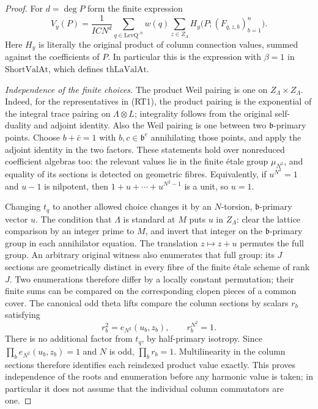 \begin{proof}
For $d=\deg P$ form the finite expression
\begin{equation}\label{eq:actual-raw-theta-sum}
 V_y(P)=\frac{1}{ICN^d}
       \sum_{q\in\mathrm{LevQ}^{,n}}w(q)
       \sum_{z\in Z_\Lambda}
          H_y\bigl(P;(F_{q,z,b})_{b=1}^n\bigr).
\end{equation}
Here $H_y$ is literally the original product of column connection
values, summed against the coefficients of $P$.  In particular
this is the expression with $\beta=1$ in
$\mathrm{ShortValAt}$, which defines $\mathrm{thLaValAt}$.

\emph{Independence of the finite choices.}
The product Weil pairing is one on
$Z_\Lambda\times Z_\Lambda$.  Indeed, for the representatives
in \textup{(RT1)}, the product pairing is the exponential of the
integral trace pairing on $\Lambda\otimes L$; integrality follows
from the original self-duality and adjoint identity.
Also the Weil pairing is one between two
$\mathfrak b$-primary points.  Choose
$b+\bar c=1$ with $b,c\in\mathfrak b^e$ annihilating those
points, and apply the adjoint identity in the two factors.
These statements hold over nonreduced coefficient algebras too:
the relevant values lie in the finite \'etale group
$\mu_{N^2}$, and equality of its sections is detected on
geometric fibres.  Equivalently, if $u^{N^2}=1$ and $u-1$ is
nilpotent, then
$1+u+\cdots+u^{N^2-1}$ is a unit, so $u=1$.

Changing $t_q$ to another allowed choice changes it by an
$N$-torsion, $\mathfrak b$-primary vector $u$.
The condition that $\Lambda$ is standard at $M$ puts $u$ in
$Z_\Lambda$: clear the lattice comparison by an integer prime
to $M$, and invert that integer on the $\mathfrak b$-primary
group in each annihilator equation.
The translation $z\mapsto z+u$ permutes the full group.
An arbitrary original witness also enumerates that full group:
its $J$ sections are geometrically distinct in every fibre of
the finite \'etale scheme of rank $J$.  Two enumerations
therefore differ by a locally constant permutation; their
finite sums can be compared on the corresponding clopen
pieces of a common cover.
The canonical odd theta lifts compare the column sections by
scalars $r_b$ satisfying
\[
       r_b^2=e_{N^2}(u_b,z_b),\qquad r_b^{N^2}=1.
\]
There is no additional factor from $t_q$, by half-primary
isotropy.  Since $\prod_b e_{N^2}(u_b,z_b)=1$ and $N$ is
odd, $\prod_b r_b=1$.  Multilinearity in the column sections
therefore identifies each reindexed product value exactly.
This proves independence of the roots and enumeration before
any harmonic value is taken; in particular it does not assume
that the individual column commutators are one.


\end{proof}
